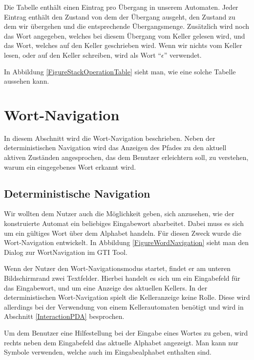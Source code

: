 Die Tabelle enthält einen Eintrag pro Übergang in unserem Automaten. Jeder
Eintrag enthält den Zustand von dem der Übergang ausgeht, den Zustand zu dem
wir übergehen und die entsprechende Übergangsmenge. Zusätzlich wird noch
das Wort angegeben, welches bei diesem Übergang vom Keller gelesen wird, und
das Wort, welches auf den Keller geschrieben wird. Wenn wir nichts vom
Keller lesen, oder auf den Keller schreiben, wird als Wort "`$\epsilon$"'
verwendet.\vspace{10pt} 

In Abbildung \ref{FigureStackOperationTable} sieht man, wie eine
solche Tabelle aussehen kann.\vspace{10pt}


\section{Wort-Navigation}\label{WordNavigation}

In diesem Abschnitt wird die Wort-Navigation beschrieben. Neben der
deterministischen Navigation wird das Anzeigen des Pfades zu den aktuell
aktiven Zuständen angesprochen, das dem Benutzer erleichtern soll, zu
verstehen, warum ein eingegebenes Wort erkannt wird.


\subsection{Deterministische Navigation}\label{WordNavigationDeterministic}

Wir wollten dem Nutzer auch die Möglichkeit geben, sich anzusehen, wie der
konstruierte Automat ein beliebiges Eingabewort abarbeitet. Dabei muss es sich
um ein gültiges Wort über dem Alphabet handeln. Für diesen Zweck wurde die
Wort-Navigation entwickelt. In Abbildung \ref{FigureWordNavigation}
sieht man den Dialog zur WortNavigation im GTI Tool.\vspace{10pt}

Wenn der Nutzer den Wort-Navigationsmodus startet, findet er am unteren
Bildschirmrand zwei Textfelder. Hierbei handelt es sich um ein Eingabefeld für
das Eingabewort, und um eine Anzeige des aktuellen Kellers. In der
deterministischen Wort-Navigation spielt die Kelleranzeige keine Rolle. Diese
wird allerdings bei der Verwendung von einem Kellerautomaten benötigt und wird
in Abschnitt \ref{InteractionPDA} besprochen.\vspace{10pt}

Um dem Benutzer eine Hilfestellung bei der Eingabe eines Wortes zu geben, wird
rechts neben dem Eingabefeld das aktuelle Alphabet angezeigt. Man kann nur
Symbole verwenden, welche auch im Eingabealphabet enthalten
sind.\vspace{10pt}

